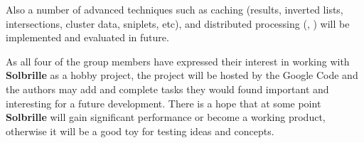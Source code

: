 Also a number of advanced techniques such as caching (results, inverted lists, intersections, cluster data, sniplets, etc), and distributed processing (\cite{master}, \cite{risvik}) will be implemented and evaluated in future.

As all four of the group members have expressed their interest in working with {\bf Solbrille} as a hobby project, the project will be hosted by the Google Code and the authors may add and complete tasks they would found important and interesting for a future development. There is a hope that at some point {\bf Solbrille} will gain significant performance or become a working product, otherwise it will be a good toy for testing ideas and concepts. 